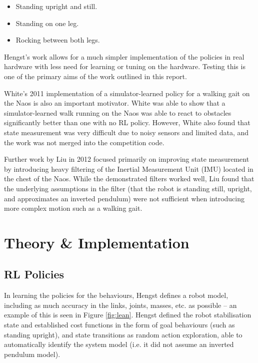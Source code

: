 \begin{itemize}
\item Standing upright and still.
\item Standing on one leg.
\item Rocking between both legs.
\end{itemize}

Hengst's work allows for a much simpler implementation of the policies in real hardware with less need for learning or tuning on the hardware. Testing this is one of the primary aims of the work outlined in this report.

White's\cite{white} 2011 implementation of a simulator-learned policy for a walking gait on the Naos is also an important motivator. White was able to show that a simulator-learned walk running on the Naos was able to react to obstacles significantly better than one with no RL policy. However, White also found that state measurement was very difficult due to noisy sensors and limited data, and the work was not merged into the competition code.

Further work by Liu\cite{liu} in 2012 focused primarily on improving state measurement by introducing heavy filtering of the Inertial Measurement Unit (IMU) located in the chest of the Naos. While the demonstrated filters worked well, Liu found that the underlying assumptions in the filter (that the robot is standing still, upright, and approximates an inverted pendulum) were not sufficient when introducing more complex motion such as a walking gait.

\section{Theory \& Implementation}

\subsection{RL Policies}
In learning the policies for the behaviours, Hengst\cite{bernhard_rl} defines a robot model, including as much accuracy in the links, joints, masses, etc. as possible -- an example of this is seen in Figure \ref{fig:lean}. Hengst defined the robot stabilisation state and established cost functions in the form of goal behaviours (such as standing upright), and state transitions as random action exploration, able to automatically identify the system model (i.e. it did not assume an inverted pendulum model). 

